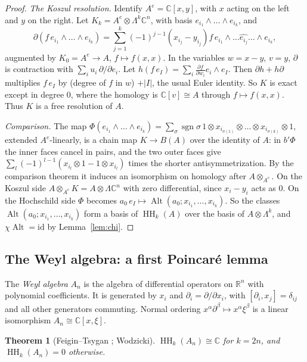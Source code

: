 \documentclass[11pt,oneside,reqno]{article}
\DeclareMathOperator{\HH}{HH}
\DeclareMathOperator{\sgn}{sgn}
\newcommand{\C}{\mathbb C}
\newcommand{\R}{\mathbb R}
\newcommand{\pa}{\partial}
\theoremstyle{plain}
\newtheorem{theorem}{Theorem}[section]
\theoremstyle{definition}
\theoremstyle{remark}
\begin{document}
\begin{proof}
\emph{The Koszul resolution.} Identify \(A^e=\C[x,y]\), with \(x\) acting on
the left and \(y\) on the right. Let \(K_k=A^e\otimes\Lambda^k\C^n\), with
basis \(e_{i_1}\wedge\dots\wedge e_{i_k}\), and
\[
 \pa(f\,e_{i_1}\wedge\dots\wedge e_{i_k})=\sum_{j=1}^k(-1)^{j-1}(x_{i_j}-y_{i_j})
 f\,e_{i_1}\wedge\dots\widehat{e_{i_j}}\dots\wedge e_{i_k},
\]
augmented by \(K_0=A^e\to A\), \(f\mapsto f(x,x)\). In the variables
\(w=x-y\), \(v=y\), \(\pa\) is contraction with \(\sum_iu_i\,\pa/\pa e_i\).
Let \(h(f\,e_I)=\sum_i\frac{\pa f}{\pa w_i}e_i\wedge e_I\). Then
\(\pa h+h\pa\) multiplies \(f\,e_I\) by (degree of \(f\) in \(w\)) \(+|I|\),
the usual Euler identity. So \(K\) is exact except in degree \(0\), where
the homology is \(\C[v]\cong A\) through \(f\mapsto f(x,x)\). Thus \(K\) is a
free resolution of \(A\).

\emph{Comparison.} The map \(\Phi(e_{i_1}\wedge\dots\wedge e_{i_k})=
\sum_\sigma\sgn\sigma\,1\otimes x_{i_{\sigma(1)}}\otimes\dots\otimes
x_{i_{\sigma(k)}}\otimes1\), extended \(A^e\)-linearly, is a chain map
\(K\to B(A)\) over the identity of \(A\): in \(b'\Phi\) the inner faces cancel
in pairs, and the two outer faces give
\(\sum_l(-1)^{l-1}(x_{i_l}\otimes1-1\otimes x_{i_l})\) times the shorter
antisymmetrization. By the comparison theorem it induces an isomorphism
on homology after \(A\otimes_{A^e}\). On the Koszul side
\(A\otimes_{A^e}K=A\otimes\Lambda\C^n\) with zero differential, since
\(x_i-y_i\) acts as \(0\). On the Hochschild side \(\Phi\) becomes
\(a_0\,e_I\mapsto\operatorname{Alt}(a_0;x_{i_1},\dots,x_{i_k})\). So the classes
\(\operatorname{Alt}(a_0;x_{i_1},\dots,x_{i_k})\) form a basis of \(\HH_k(A)\) over
the basis of \(A\otimes\Lambda^k\), and \(\chi\operatorname{Alt}=\mathrm{id}\) by
Lemma~\ref{lem:chi}.
\end{proof}

\subsection{The Weyl algebra: a first Poincaré lemma}\label{subsec:weyl}
The \emph{Weyl algebra} \(A_n\) is the algebra of differential operators on
\(\R^n\) with polynomial coefficients. It is generated by \(x_i\) and
\(\pa_i=\pa/\pa x_i\), with \([\pa_i,x_j]=\delta_{ij}\) and all other
generators commuting. Normal ordering \(x^\alpha\pa^\beta\mapsto
x^\alpha\xi^\beta\) is a linear isomorphism \(A_n\cong\C[x,\xi]\).

\begin{theorem}[Feigin--Tsygan \cite{FeiginTsygan}; Wodzicki]\label{thm:weyl}
\(\HH_k(A_n)\cong\C\) for \(k=2n\), and \(\HH_k(A_n)=0\) otherwise.
\end{theorem}
\end{document}
